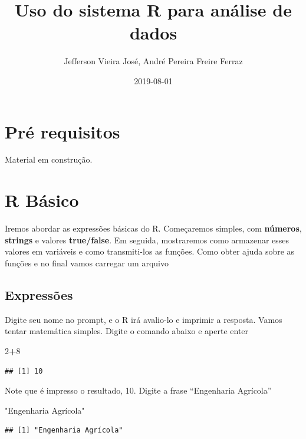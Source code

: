\documentclass[]{book}
\title{Uso do sistema R para análise de dados}
\author{Jefferson Vieira José, André Pereira Freire Ferraz}
\date{2019-08-01}
\newenvironment{Shaded}{\begin{snugshade}}{\end{snugshade}}
\newcommand{\DecValTok}[1]{\textcolor[rgb]{0.00,0.00,0.81}{#1}}
\newcommand{\OperatorTok}[1]{\textcolor[rgb]{0.81,0.36,0.00}{\textbf{#1}}}
\newcommand{\StringTok}[1]{\textcolor[rgb]{0.31,0.60,0.02}{#1}}
\begin{document}
\maketitle

{
\setcounter{tocdepth}{1}
\tableofcontents
}
\hypertarget{pre-requisitos}{%
\chapter{Pré requisitos}\label{pre-requisitos}}

Material em construção.

\hypertarget{intro}{%
\chapter{R Básico}\label{intro}}

Iremos abordar as expressões básicas do R.
Começaremos simples, com \textbf{números}, \textbf{strings} e valores \textbf{true/false}. Em seguida, mostraremos como armazenar esses valores em variáveis e como transmiti-los as funções. Como obter ajuda sobre as funções e no final vamos carregar um arquivo

\hypertarget{expressoes}{%
\section{Expressões}\label{expressoes}}

Digite seu nome no prompt, e o R irá avalio-lo e imprimir a resposta.
Vamos tentar matemática simples. Digite o comando abaixo e aperte enter

\begin{Shaded}
\begin{Highlighting}[]
\DecValTok{2}\OperatorTok{+}\DecValTok{8}
\end{Highlighting}
\end{Shaded}

\begin{verbatim}
## [1] 10
\end{verbatim}

Note que é impresso o resultado, 10.
Digite a frase ``Engenharia Agrícola''

\begin{Shaded}
\begin{Highlighting}[]
\StringTok{"Engenharia Agrícola"}
\end{Highlighting}
\end{Shaded}

\begin{verbatim}
## [1] "Engenharia Agrícola"
\end{verbatim}
\end{document}
